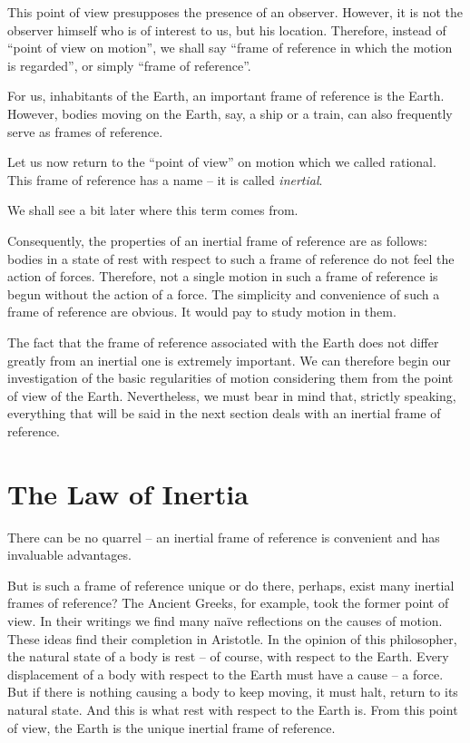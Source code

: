 This point of view presupposes the presence of an observer. However,
it is not the observer himself who is of interest to us, but his
location. Therefore, instead of ``point of view on motion'', we shall
say ``frame of reference in which the motion is regarded'', or simply
``frame of reference''.

For us, inhabitants of
the Earth, an important frame of reference is the Earth. However,
bodies moving on the Earth, say, a ship or a train, can also
frequently serve as frames of reference.  

Let us now return to the ``point of view'' on motion which we called
rational. This frame of reference has a name -- it is called
\emph{inertial}.

We shall see a bit later where this term comes from.  

Consequently, the properties of an inertial frame of reference are as
follows: bodies in a state of rest with respect to such a frame of
reference do not feel the action of forces. Therefore, not a single
motion in such a frame of reference is begun without the action of a
force. The simplicity and convenience of such a frame of reference are
obvious. It would pay to study motion in them.  

The fact that the frame of reference associated with the Earth does
not differ greatly from an inertial one is extremely important. We can
therefore begin our investigation of the basic regularities of motion
considering them from the point of view of the Earth. Nevertheless, we
must bear in mind that, strictly speaking, everything that will be
said in the next section deals with an inertial frame of reference.

\section{The Law of Inertia}
There can be no quarrel -- an inertial frame of reference
is convenient and has invaluable advantages.

But is such a frame of reference unique or do there,
perhaps, exist many inertial frames of reference? The
Ancient Greeks, for example, took the former point of
view. In their writings we find many na\"ive reflections
on the causes of motion. These ideas find their completion
in Aristotle. In the opinion of this philosopher, the
natural state of a body is rest -- of course, with respect
to the Earth. Every displacement of a body with respect
to the Earth must have a cause -- a force. But if there is
nothing causing a body to keep moving, it must halt,
return to its natural state. And this is what rest with
respect to the Earth is. From this point of view, the
Earth is the unique inertial frame of reference.

